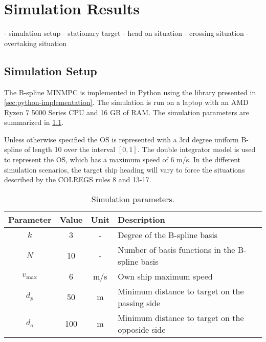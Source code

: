 
\chapter{Simulation Results}\label{chap:simulation-results}

- simulation setup
- stationary target
- head on situation
- crossing situation
- overtaking situation

\section{Simulation Setup}\label{sec:simulation-setup}

The B-spline MINMPC is implemented in Python using the library presented in \cref{sec:python-implementation}. The simulation is run on a laptop with an AMD Ryzen 7 5000 Series CPU and 16 GB of RAM. The simulation parameters are summarized in \cref{tab:simulation-parameters}. 

Unless otherwise specified the OS is represented with a 3rd degree uniform B-spline of length 10 over the interval $[0, 1]$. The double integrator model is used to represent the OS, which has a maximum speed of 6 m/s. In the different simulation scenarios, the target ship heading will vary to force the situations described by the COLREGS rules 8 and 13-17.

\begin{table}[H]
    \centering
    \begin{tabular}{|c|c|c|p{7cm}|}
        \hline
        Parameter & Value & Unit & Description \\
        \hline
        \rule{0pt}{2.5ex}$k$ & 3 & - & Degree of the B-spline basis \\
        \hline
        \rule{0pt}{2.5ex}$N$ & 10 & - & Number of basis functions in the B-spline basis \\
        \hline
        \rule{0pt}{2.5ex}$v_\text{max}$ & 6 & m/s & Own ship maximum speed \\
        \hline
        \rule{0pt}{2.5ex}$d_p$ & 50 & m & Minimum distance to target on the passing side \\
        \hline
        \rule{0pt}{2.5ex}$d_o$ & 100 & m & Minimum distance to target on the opposide side \\
        \hline
    \end{tabular}
    \caption{Simulation parameters.}
    \label{tab:simulation-parameters}
\end{table}


